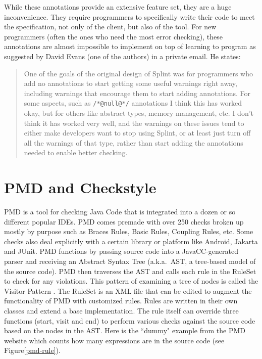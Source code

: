 \documentclass[12pt]{report}
\newcommand{\todoin}{\todo[inline]}
\def\lstlistingname{Figure}
\newcommand{\refCode}{\lstlistingname \hspace{1mm}}
\begin{document}
While these annotations provide an extensive feature set, they are a huge inconvenience. They 
require programmers to specifically write their code to meet the specification, not only of the client, but 
also of the tool. For new programmers (often the ones who need the most error checking), these 
annotations are almost impossible to implement on top of learning to program as suggested by  
David Evans (one of the authors) in a private email. He states:
\begin{quote} \singlespacing
One of the goals of the original design of 
Splint was for programmers who add no annotations to start getting some useful warnings right away, 
including warnings that encourage them to start adding annotations.  For some aspects, such as 
\lstinline{/*@null@*/} annotations I think this has worked okay, but for others like abstract types, 
memory management, etc. I don't think it has worked very well, and the warnings on these issues tend 
to either make developers want to stop using Splint, or at least just turn off all the warnings of that type, 
rather than start adding the annotations needed to enable better checking. \cite{evans-email} 
\end{quote}

\section{PMD and Checkstyle}
PMD is a tool for checking Java Code that is integrated into a dozen or so different popular IDEs.
PMD comes premade with over 250 checks broken up mostly by purpose such as Braces Rules, 
Basic Rules, Coupling Rules, etc. Some checks also deal explicitly with a certain 
library or platform like Android, Jakarta and JUnit. PMD functions by passing source code into a 
JavaCC-generated parser and receiving an Abstract Syntax Tree (a.k.a.\ AST, a tree-based model of 
the source code). PMD then traverses the AST and calls each rule in the RuleSet to check for any
violations. This pattern of examining a tree of nodes is called the Visitor Pattern \cite{design-patterns}. 
The RuleSet is an XML file that can be edited to augment the functionality of PMD with customized 
rules. Rules are written in their own classes and extend a base implementation. The rule itself can 
override three functions (start, visit and end) to perform various checks against the source code based 
on the nodes in the AST. Here is the ``dummy" example from the PMD website which counts how 
many expressions are in the source code (see \refCode \ref{pmd-rule}).
\todoin{why PMD doesn't work}
\end{document}
